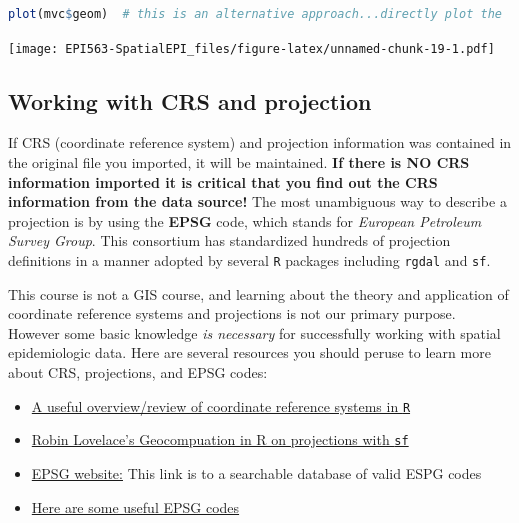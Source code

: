 \documentclass[
]{book}
\newcommand{\passthrough}[1]{#1}
\providecommand{\tightlist}{%
  \setlength{\itemsep}{0pt}\setlength{\parskip}{0pt}}
\begin{document}
\begin{lstlisting}[language=R]
plot(mvc$geom)  # this is an alternative approach...directly plot the 'geom' column
\end{lstlisting}

\texttt{[image: EPI563-SpatialEPI\_files/figure-latex/unnamed-chunk-19-1.pdf]}

\hypertarget{working-with-crs-and-projection}{%
\subsection{Working with CRS and projection}\label{working-with-crs-and-projection}}

If CRS (coordinate reference system) and projection information was contained in the original file you imported, it will be maintained. \textbf{If there is NO CRS information imported it is critical that you find out the CRS information from the data source!} The most unambiguous way to describe a projection is by using the \textbf{EPSG} code, which stands for \emph{European Petroleum Survey Group}. This consortium has standardized hundreds of projection definitions in a manner adopted by several \passthrough{\lstinline!R!} packages including \passthrough{\lstinline!rgdal!} and \passthrough{\lstinline!sf!}.

This course is not a GIS course, and learning about the theory and application of coordinate reference systems and projections is not our primary purpose. However some basic knowledge \emph{is necessary} for successfully working with spatial epidemiologic data. Here are several resources you should peruse to learn more about CRS, projections, and EPSG codes:

\begin{itemize}
\tightlist
\item
  \href{https://www.nceas.ucsb.edu/sites/default/files/2020-04/OverviewCoordinateReferenceSystems.pdf}{A useful overview/review of coordinate reference systems in \passthrough{\lstinline!R!}}
\item
  \href{https://geocompr.robinlovelace.net/reproj-geo-data.html}{Robin Lovelace's Geocompuation in R on projections with \passthrough{\lstinline!sf!}}
\item
  \href{https://epsg.io/}{EPSG website:} This link is to a searchable database of valid ESPG codes
\item
  \href{https://guides.library.duke.edu/r-geospatial/CRS}{Here are some useful EPSG codes}
\end{itemize}
\end{document}
